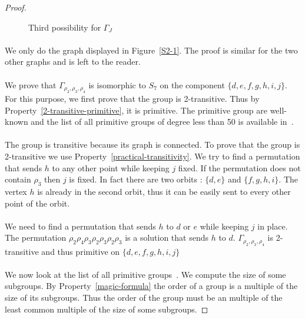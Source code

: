 \begin{proof}
\begin{figure}[H]
\begin{center}
\begin{tikzpicture}[scale=.8]
      \end{tikzpicture}
      \caption{Third possibility for $\Gamma_{J}$}
    \end{center}
  \end{figure}

  \paragraph{}
  We only do the graph displayed in Figure~\ref{S2-1}. The proof is similar for the two other graphs and is left to the reader.

  \paragraph{}
  We prove that $\Gamma_{\rho_2,\rho_3,\rho_4}$ is isomorphic to $S_7$ on the component $\{d,e,f,g,h,i,j\}$. For this purpose, we first prove that the group is 2-transitive. Thus by Property~\ref{2-transitive-primitive}, it is primitive. The primitive group are well-known and the list of all primitive groups of degree less than 50 is available in~\cite{buekenhout1996list}.

  \paragraph{}
  The group is transitive because its graph is connected. To prove that the group is 2-transitive we use Property~\ref{practical-transitivity}. We try to find a permutation that sends $h$ to any other point while keeping $j$ fixed. If the permutation does not contain $\rho_3$ then $j$ is fixed. In fact there are two orbits : $\{d,e\}$ and $\{f,g,h,i\}$. The vertex $h$ is already in the second orbit, thus it can be easily sent to every other point of the orbit.

  \paragraph{}
  We need to find a permutation that sends $h$ to $d$ or $e$ while keeping $j$ in place. The permutation $\rho_2 \rho_4 \rho_3 \rho_2 \rho_3 \rho_2 \rho_3$ is a solution that sends $h$ to $d$. $\Gamma_{\rho_2, \rho_3, \rho_4}$ is 2-transitive and thus primitive on $\{d,e,f,g,h,i,j\}$

  \paragraph{}
  We now look at the list of all primitive groups~\cite{buekenhout1996list}. We compute the size of some subgroups. By Property~\ref{magic-formula} the order of a group is a multiple of the size of its subgroups. Thus the order of the group must be an multiple of the least common multiple of the size of some subgroups.


\end{proof}
